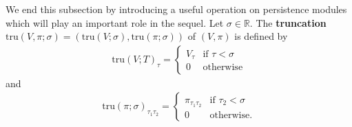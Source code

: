 \documentclass[12pt]{amsart}
\theoremstyle{definition}
\newtheorem{definition}[theorem]{Definition}
\newcommand{\RR}{{\mathbb R}}
\begin{document}
We end this subsection by introducing a useful operation on persistence modules which will play an important role in the sequel. Let $\sigma\in \RR$. The \textbf{truncation} $\text{tru}(V,\pi ;\sigma ) = (\text{tru}(V;\sigma), \text{tru}(\pi;\sigma))$ of $(V,\pi)$ is defined by
        \begin{align*}
            \text{tru}(V;T)_\tau = \begin{cases}
                V_\tau &\text{if}\,\, \tau<\sigma\\
                0 &\text{otherwise}
            \end{cases}
         \end{align*}
        and
        \begin{align*}
            \text{tru}(\pi;\sigma)_{\tau_1 \tau_2} = \begin{cases}
                \pi_{\tau_1 \tau_2}&\text{if}\,\, \tau_2< \sigma\\
                0 &\text{otherwise}.
            \end{cases}
        \end{align*}
\end{document}
